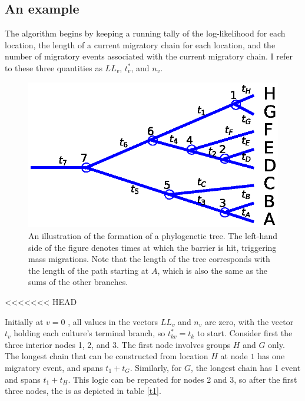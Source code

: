 \documentclass[11pt]{article}
\begin{document}
\subsection{An example}
The algorithm begins by keeping a running tally of the log-likelihood for each location, the length of a current migratory chain for each location, and the number of migratory events associated with the current migratory chain. I refer to these three quantities as $LL_v$, $t_v^*$, and $n_v$. 
\begin{figure}
\begin{center}
\includegraphics[width=\textwidth]{AncillaryFiles//algofig.eps}
\caption{An illustration of the formation of a phylogenetic tree. The left-hand side of the figure denotes times at which the barrier is hit, triggering mass migrations. Note that the length of the tree corresponds with the length of the path starting at $A$, which is also the same as the sums of the other branches.} \label{afig}
\end{center} 
\end{figure}

<<<<<<< HEAD


Initially at $v=0$ , all values in the vectors $LL_v$ and $n_v$ are zero, with the vector $t_v$ holding each culture's terminal branch, so $t_{kv}^*=t_k$ to start. Consider first the three interior nodes 1, 2, and 3. The first node involves groups $H$ and $G$ only. The longest chain that can be constructed from location $H$ at node $1$ has one migratory event, and spans $t_1+t_G$. Similarly, for $G$, the longest chain has 1 event and spans $t_1+t_H$. This logic can be repeated for nodes 2 and 3, so after the first three nodes, the is as depicted in table \ref{t1}.
\end{document}
